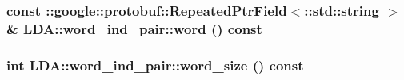 \label{class_l_d_a_1_1word__ind__pair_a55bf7a00bb63ae558add53941e5b08e0}
\hypertarget{class_l_d_a_1_1word__ind__pair_a5d2404f6aee1a31b4d346e4612da24c4}{
\subsubsection[{word}]{\setlength{\rightskip}{0pt plus 5cm}const ::google::protobuf::RepeatedPtrField$<$::std::string $>$ \& LDA::word\_\-ind\_\-pair::word () const}}
\label{class_l_d_a_1_1word__ind__pair_a5d2404f6aee1a31b4d346e4612da24c4}
\hypertarget{class_l_d_a_1_1word__ind__pair_a648b4f09c48395e4256082e7a42b24a4}{
\subsubsection[{word\_\-size}]{\setlength{\rightskip}{0pt plus 5cm}int LDA::word\_\-ind\_\-pair::word\_\-size () const}}
\label{class_l_d_a_1_1word__ind__pair_a648b4f09c48395e4256082e7a42b24a4}


